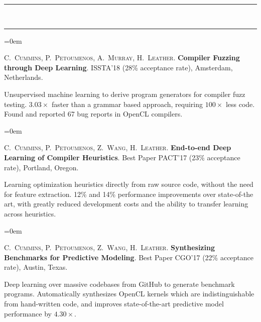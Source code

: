 \documentclass[a4paper,11pt,hidelinks]{scrartcl}
\newcommand{\MarginText}[1]{\marginpar{\raggedleft\itshape\normalsize#1}}
\newcommand{\Title}[1]{\noindent\rule{15cm}{0.4pt}\vspace{-.45em}\\
\noindent\spacedlowsmallcaps{\color{titlecolour}{#1}}

\vspace{-.85em}\noindent\rule{15cm}{0.4pt}\vspace{.2em}}
\newcommand{\Description}[1]{\hangindent=0em\hangafter=0%
\noindent\normalsize{#1}\vspace{1em}}
\newcommand{\Publication}[5]{\Description{\MarginText{#1}#2. \textbf{\href{#5}{#3}}. #4.}}
\begin{document}
\begin{cv}


\newpage


\Title{Publications}

\Description{\MarginText{\textit{2018}}C.\ \textsc{Cummins}, P.\
  \textsc{Petoumenos}, A.\ \textsc{Murray}, H.\
  \textsc{Leather}. \textbf{Compiler Fuzzing through Deep Learning}. ISSTA'18 (28\% acceptance rate), Amsterdam, Netherlands.\@
  \newline\vspace{-1em}
  
  \noindent %
  Unsupervised machine learning to derive program generators for compiler fuzz testing. $3.03\times$ faster than a grammar based approach, requiring $100\times$ less code. Found and reported 67 bug reports in OpenCL compilers.
}

\vspace{-.4em}
\Description{\MarginText{\textit{2017}}C.\ \textsc{Cummins}, P.\
  \textsc{Petoumenos}, Z.\ \textsc{Wang}, H.\
  \textsc{Leather}. \textbf{End-to-end Deep Learning of Compiler Heuristics}. Best Paper PACT'17 (23\% acceptance rate), Portland, Oregon.\@
  \newline\vspace{-1em}

  \noindent %
  Learning optimization heuristics directly from raw source code, without the need for feature extraction. 12\% and 14\% performance improvements over state-of-the art, with greatly reduced development costs and the ability to transfer learning across heuristics.%
}

\vspace{-.4em}
\Description{\MarginText{2017}C.\ \textsc{Cummins}, P.\
  \textsc{Petoumenos}, Z.\ \textsc{Wang}, H.\
  \textsc{Leather}. \textbf{Synthesizing Benchmarks for Predictive Modeling}. Best Paper CGO'17 (22\% acceptance rate), Austin, Texas.\@
  \newline\vspace{-1em}

  \noindent %
  Deep learning over massive codebases from GitHub to generate benchmark programs. Automatically synthesizes OpenCL kernels which are indistinguishable from hand-written code, and improves state-of-the-art predictive model performance by $4.30\times$.%
}
\vspace{-1.8em}


\end{cv}
\end{document}
